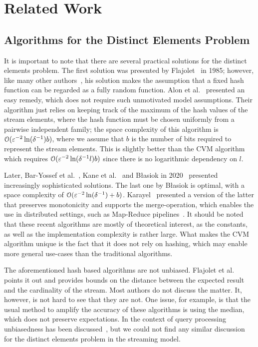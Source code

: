 \section{Related Work}\label{sec:related_work}
\subsection{Algorithms for the Distinct Elements Problem}
It is important to note that there are several practical solutions for the distinct elements problem.
The first solution was presented by Flajolet~\cite{flajolet1985} in 1985; however, like many other authors~\cite{flajolet2007,heule2013,pettie2021}, his solution makes the assumption that a fixed hash function can be regarded as a fully random function.
Alon et al.~\cite[Section 2.3]{alon1999} presented an easy remedy, which does not require such unmotivated model assumptions.
Their algorithm just relies on keeping track of the maximum of the hash values of the stream elements, where the hash function must be chosen uniformly from a pairwise independent family; the space complexity of this algorithm is $\operatorname{\mathcal O}(\varepsilon^{-2} \ln (\delta^{-1}) b)$, where we assume that $b$ is the number of bits required to represent the stream elements.
This is slightly better than the CVM algorithm which requires $\operatorname{\mathcal O}(\varepsilon^{-2} \ln (\delta^{-1}l) b)$ since there is no logarithmic dependency on $l$.

Later, Bar-Yossef et al.~\cite{baryossef2002}, Kane et al.~\cite{kane2010} and B\l{}asiok in 2020~\cite{blasiok2020} presented increasingly sophisticated solutions.
The last one by B\l{}asiok is optimal, with a space complexity of $\operatorname{\mathcal O}(\varepsilon^{-2} \ln (\delta^{-1}) + b)$.
Karayel~\cite{karayel2023} presented a version of the latter that preserves monotonicity and supports the merge-operation, which enables the use in distributed settings, such as Map-Reduce pipelines~\cite{dean2010}.
It should be noted that these recent algorithms are mostly of theoretical interest, as the constants, as well as the implementation complexity is rather large.
What makes the CVM algorithm unique is the fact that it does not rely on hashing, which may enable more general use-cases than the traditional algorithms.

The aforementioned hash based algorithms are not unbiased.
Flajolet et al.~\cite{flajolet1985} points it out and provides bounds on the distance between the expected result and the cardinality of the stream.
Most authors do not discuss the matter.
It, however, is not hard to see that they are not.
One issue, for example, is that the usual method to amplify the accuracy of these algorithms is using the median, which does not preserve expectations.
In the context of query processing unbiasedness has been discussed~\cite[Section 2.1]{haas1995}, but we could not find any similar discussion for the distinct elements problem in the streaming model.

